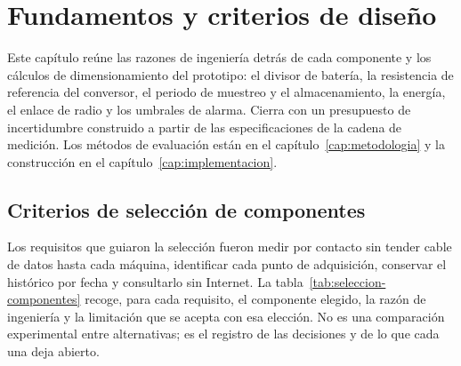 \chapter{Fundamentos y criterios de diseño}
\label{cap:fundamentos}

Este capítulo reúne las razones de ingeniería detrás de cada componente y los cálculos de dimensionamiento del prototipo: el divisor de batería, la resistencia de referencia del conversor, el periodo de muestreo y el almacenamiento, la energía, el enlace de radio y los umbrales de alarma. Cierra con un presupuesto de incertidumbre construido a partir de las especificaciones de la cadena de medición. Los métodos de evaluación están en el capítulo~\ref{cap:metodologia} y la construcción en el capítulo~\ref{cap:implementacion}.

\section{Criterios de selección de componentes}
\label{sec:fund-seleccion}
Los requisitos que guiaron la selección fueron medir por contacto sin tender cable de datos hasta cada máquina, identificar cada punto de adquisición, conservar el histórico por fecha y consultarlo sin Internet. La tabla~\ref{tab:seleccion-componentes} recoge, para cada requisito, el componente elegido, la razón de ingeniería y la limitación que se acepta con esa elección. No es una comparación experimental entre alternativas; es el registro de las decisiones y de lo que cada una deja abierto.

